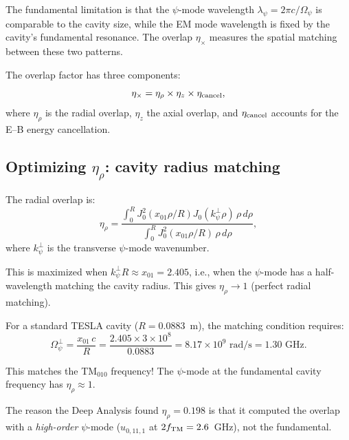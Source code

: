 \documentclass[11pt]{article}
\newcommand{\ee}[1]{\times 10^{#1}}
\newcommand{\Opsi}{\Omega_\psi}
\begin{document}
The fundamental limitation is that the $\psi$-mode wavelength
$\lambda_\psi = 2\pi c/\Opsi$ is comparable to the cavity size,
while the EM mode wavelength is fixed by the cavity's fundamental
resonance. The overlap $\eta_\times$ measures the spatial matching
between these two patterns.

The overlap factor has three components:
\begin{equation}
\eta_\times = \eta_\rho \times \eta_z \times \eta_{\rm cancel},
\end{equation}
where $\eta_\rho$ is the radial overlap, $\eta_z$ the axial overlap,
and $\eta_{\rm cancel}$ accounts for the E--B energy cancellation.

\subsection{Optimizing $\eta_\rho$: cavity radius matching}

The radial overlap is:
\begin{equation}
\eta_\rho = \frac{\int_0^R J_0^2(x_{01}\rho/R)
J_0(k_\psi^\perp\rho)\,\rho\,d\rho}
{\int_0^R J_0^2(x_{01}\rho/R)\,\rho\,d\rho},
\end{equation}
where $k_\psi^\perp$ is the transverse $\psi$-mode wavenumber.

This is maximized when $k_\psi^\perp R \approx x_{01} = 2.405$,
i.e., when the $\psi$-mode has a half-wavelength matching the cavity
radius. This gives $\eta_\rho \to 1$ (perfect radial matching).

For a standard TESLA cavity ($R = 0.0883$~m), the matching condition
requires:
\begin{equation}
\Opsi^\perp = \frac{x_{01}\,c}{R}
= \frac{2.405 \times 3\ee{8}}{0.0883}
= 8.17\ee{9}\text{ rad/s}
= 1.30\text{ GHz}.
\end{equation}

This matches the TM$_{010}$ frequency! The $\psi$-mode at the
fundamental cavity frequency has $\eta_\rho \approx 1$.

The reason the Deep Analysis found $\eta_\rho = 0.198$ is that it
computed the overlap with a \emph{high-order} $\psi$-mode
($u_{0,11,1}$ at $2f_{\rm TM} = 2.6$~GHz), not the fundamental.
\end{document}
